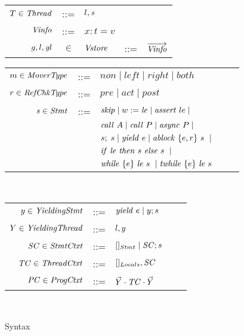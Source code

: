 \begin{figure}
\begin{tabular}{rclcl}
$T \in \mathit{Thread}$ & ::=  & $l, \mathit{s}$ \\
$\mathit{Vinfo}$ & ::= & $x:t=v$ \\
$g,l,\mathit{gl}$ & $\in$ & $\mathit{Vstore}$ & ::= & $\overrightarrow{\mathit{Vinfo}}$ \\
\end{tabular}
\begin{tabular}{rclcl}
$m \in \mathit{MoverType}$ &::= &$\mathit{non} \mid \mathit{left} \mid \mathit{right} \mid \mathit{both}$ \\
$r \in \mathit{RefChkType}$ &::= &$\mathit{pre} \mid \mathit{act} \mid \mathit{post} $ \\
$\mathit{s} \in \mathit{Stmt}$ &::= & $\mathit{skip} \mid w := \mathit{le} \mid
\mathit{assert}\ le \mid $ \\
                  & & $\mathit{call}\ A \mid \mathit{call}\ P \mid \mathit{async}\ P \mid $\\
                  & & $s;\;s \mid \mathit{yield}\ e \mid \mathit{ablock}\ {\{e,r\}}\ {s}\  \mid$\\
                 & & ${\mathit{if}\ {\mathit{le}}\ }{\mathit{then}\ {s}\ }{\mathit{else}\ {s}\ } \mid$ \\
                  & & $\mathit{while}\ \{{e}\}\ {{\mathit{le}}\ } {{s}\ } \mid \mathit{twhile}\ \{{e}\}\ {{\mathit{le}}\ } {{s}\ }$
                  \\ 
\end{tabular}\\
\begin{tabular}{rclcl}
$y \in \mathit{YieldingStmt}$ &::= &$\mathit{yield}\ e \mid y;s$ \\
$Y \in \mathit{YieldingThread}$ &::= &$l, y$ \\
$\mathit{SC} \in \mathit{StmtCtxt}$ &::= &$[]_{Stmt} \mid \mathit{SC};s$ \\
$\mathit{TC} \in \mathit{ThreadCtxt}$ &::= &$[]_{Locals}, \mathit{SC}$ \\
$\mathit{PC} \in \mathit{ProgCtxt}$ &::= &$\vec{Y} \cdot \mathit{TC} \cdot \vec{Y}$ \\
\end{tabular}\\
\setlength{\tabcolsep}{6pt}
\caption{Syntax}
\label{fig:syntax}
\end{figure}


